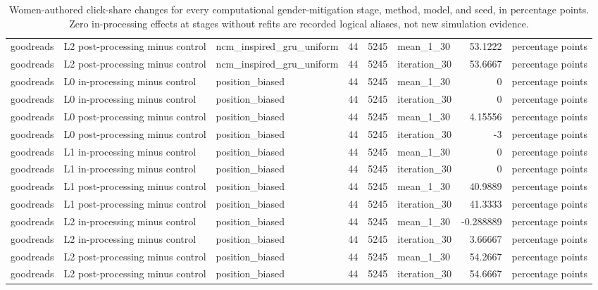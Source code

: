 \begin{table}[htbp!]
\begin{tabular}{lllrrlrl}
goodreads & L2 post-processing minus control & ncm\_inspired\_gru\_uniform & 44 & 5245 & mean\_1\_30 & 53.1222 & percentage points \\
goodreads & L2 post-processing minus control & ncm\_inspired\_gru\_uniform & 44 & 5245 & iteration\_30 & 53.6667 & percentage points \\
goodreads & L0 in-processing minus control & position\_biased & 44 & 5245 & mean\_1\_30 & 0 & percentage points \\
goodreads & L0 in-processing minus control & position\_biased & 44 & 5245 & iteration\_30 & 0 & percentage points \\
goodreads & L0 post-processing minus control & position\_biased & 44 & 5245 & mean\_1\_30 & 4.15556 & percentage points \\
goodreads & L0 post-processing minus control & position\_biased & 44 & 5245 & iteration\_30 & -3 & percentage points \\
goodreads & L1 in-processing minus control & position\_biased & 44 & 5245 & mean\_1\_30 & 0 & percentage points \\
goodreads & L1 in-processing minus control & position\_biased & 44 & 5245 & iteration\_30 & 0 & percentage points \\
goodreads & L1 post-processing minus control & position\_biased & 44 & 5245 & mean\_1\_30 & 40.9889 & percentage points \\
goodreads & L1 post-processing minus control & position\_biased & 44 & 5245 & iteration\_30 & 41.3333 & percentage points \\
goodreads & L2 in-processing minus control & position\_biased & 44 & 5245 & mean\_1\_30 & -0.288889 & percentage points \\
goodreads & L2 in-processing minus control & position\_biased & 44 & 5245 & iteration\_30 & 3.66667 & percentage points \\
goodreads & L2 post-processing minus control & position\_biased & 44 & 5245 & mean\_1\_30 & 54.2667 & percentage points \\
goodreads & L2 post-processing minus control & position\_biased & 44 & 5245 & iteration\_30 & 54.6667 & percentage points \\
\hline
\end{tabular}
\caption{Women-authored click-share changes for every computational gender-mitigation stage, method, model, and seed, in percentage points. Zero in-processing effects at stages without refits are recorded logical aliases, not new simulation evidence.}
\label{chap:results:tab:rq7_gender_mitigation_click_effects}
\end{table}
